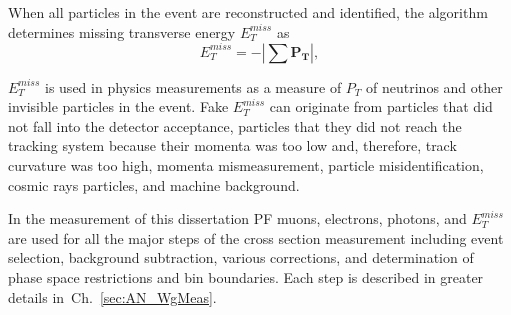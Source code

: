 When all particles in the event are reconstructed and identified, the algorithm determines missing transverse energy $E_T^{miss}$ as 
\begin{equation}\label{eq:MET}
  E_T^{miss} = - | \sum \mathbf{P_T} |,
\end{equation}

$E_T^{miss}$ is used in physics measurements as a measure of $P_T$ of neutrinos and other invisible particles in the event. Fake $E_T^{miss}$ can originate from particles that did not fall into the detector acceptance, particles that they did not reach the tracking system because their momenta was too low and, therefore, track curvature was too high, momenta mismeasurement, particle misidentification, cosmic rays particles, and machine background.

In the measurement of this dissertation PF muons, electrons, photons, and $E_T^{miss}$ are used for all the major steps of the cross section measurement including event selection, background subtraction, various corrections, and determination of phase space restrictions and bin boundaries. Each step is described in greater details in~Ch.~\ref{sec:AN_WgMeas}. 


